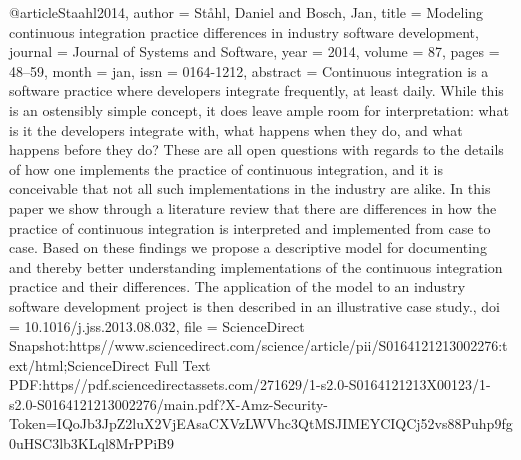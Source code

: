{{{{{{@article{Staahl2014,
  author   = {Ståhl, Daniel and Bosch, Jan},
  title    = {Modeling continuous integration practice differences in industry software development},
  journal  = {Journal of Systems and Software},
  year     = {2014},
  volume   = {87},
  pages    = {48--59},
  month    = jan,
  issn     = {0164-1212},
  abstract = {Continuous integration is a software practice where developers integrate frequently, at least daily. While this is an ostensibly simple concept, it does leave ample room for interpretation: what is it the developers integrate with, what happens when they do, and what happens before they do? These are all open questions with regards to the details of how one implements the practice of continuous integration, and it is conceivable that not all such implementations in the industry are alike. In this paper we show through a literature review that there are differences in how the practice of continuous integration is interpreted and implemented from case to case. Based on these findings we propose a descriptive model for documenting and thereby better understanding implementations of the continuous integration practice and their differences. The application of the model to an industry software development project is then described in an illustrative case study.},
  doi      = {10.1016/j.jss.2013.08.032},
  file     = {ScienceDirect Snapshot:https\://www.sciencedirect.com/science/article/pii/S0164121213002276:text/html;ScienceDirect Full Text PDF:https\://pdf.sciencedirectassets.com/271629/1-s2.0-S0164121213X00123/1-s2.0-S0164121213002276/main.pdf?X-Amz-Security-Token=IQoJb3JpZ2luX2VjEAsaCXVzLWVhc3QtMSJIMEYCIQCj52vs88Puhp9fg0uHSC3lb3KLql8MrPPiB9%
}}}}}}}}
